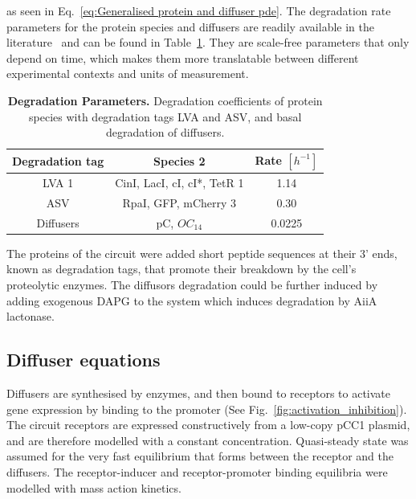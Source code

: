 as seen in Eq.~\ref{eq:Generalised protein and diffuser pde}.
The degradation rate parameters for the protein species and diffusers are readily available in the literature~\parencite{Andersen1998, kaufmann2005revisiting} and can be found in Table~\ref{table:degradation table}.
They are scale-free parameters that only depend on time, which makes them more translatable between different experimental contexts and units of measurement.



\begin{table}[H]
    \centering
    \begin{tabular}{|c|c|c|}
        \hline
        \textbf{Degradation tag} & \textbf{Species 2} & \textbf{Rate $[h^{-1}]$} \\
        \hline
        LVA 1 & CinI, LacI, cI, cI*, TetR 1 & 1.14 \\
        \hline
        ASV & RpaI, GFP, mCherry 3 & 0.30 \\
        \hline
        Diffusers & pC, $OC_{14}$ & 0.0225 \\
        \hline
    \end{tabular}
    \caption{\textbf{Degradation Parameters.} Degradation coefficients of protein species with degradation tags LVA and ASV, and basal degradation of diffusers.}
    \label{table:degradation table}
\end{table}

The proteins of the circuit were added short peptide sequences at their 3’ ends, known as degradation tags, that promote their breakdown by the cell’s proteolytic enzymes.
The diffusors degradation could be further induced by adding exogenous DAPG to the system which induces degradation by AiiA lactonase.






\subsection{Diffuser equations}
Diffusers are synthesised by enzymes, and then bound to receptors to activate gene expression by binding to the promoter (See Fig.~\ref{fig:activation_inhibition}). %
The circuit receptors are expressed constructively from a low-copy pCC1 plasmid, and are therefore modelled with a constant concentration.
Quasi-steady state was assumed for the very fast equilibrium that forms between the receptor and the diffusers.
The receptor-inducer and receptor-promoter binding equilibria were modelled with mass action kinetics.

